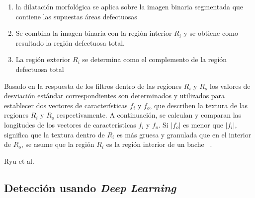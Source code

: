 \begin{enumerate}
	\item la dilatación morfológica se aplica sobre la imagen binaria segmentada que contiene
	las supuestas áreas defectuosas
	\item Se combina la imagen binaria con la región interior $R_i$ y se obtiene como resultado la región defectuosa total.
	\item La región exterior $R_i$ se determina como el complemento de la región defectuosa total
\end{enumerate}

Basado en la respuesta de los filtros dentro de las regiones $R_i$ y $R_o$ los valores de desviación estándar correspondientes son
determinados y utilizados para establecer dos vectores de características $f_i$ y $f_o$, que describen la textura de las regiones $R_i$ 
y $R_o$ respectivamente. A continuación, se calculan y comparan las longitudes de los vectores de características $f_i$ y $f_o$.
Si $|f_o|$  es menor que  $|f_i|$, significa que la textura dentro de $R_i$ es más gruesa y granulada que en el interior de $R_o$, se asume 
que la región $R_i$ es la región interior de un bache ~.


Ryu et al. ~ 




\subsection{Detección usando \emph{Deep Learning}}


